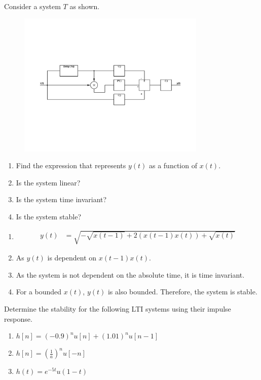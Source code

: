 \documentclass[fleqn, a4paper, 11pt, oneside]{amsart}
\theoremstyle{definition}
\theoremstyle{theorem}
\begin{document}
\begin{question}
	Consider a system $T$ as shown.
	\begin{figure}[H]
		\centering
		\includegraphics[width = 0.8\textwidth]{./plot2.pdf}
	\end{figure}
	\begin{enumerate}
		\item Find the expression that represents $y(t)$ as a function of $x(t)$.
		\item Is the system linear?
		\item Is the system time invariant?
		\item Is the system stable?
	\end{enumerate}
\end{question}

\begin{solution}
	\begin{enumerate}[leftmargin=*]
		\item
			\begin{align*}
				y(t) & = \sqrt{-\sqrt{x(t - 1)} + 2 \left( x(t - 1) x(t) \right) + \sqrt{x(t)}}
			\end{align*}
		\item
			As $y(t)$ is dependent on $x(t - 1) x(t)$.
		\item
			As the system is not dependent on the absolute time, it is time invariant.
		\item
			For a bounded $x(t)$, $y(t)$ is also bounded.
			Therefore, the system is stable.
	\end{enumerate}
\end{solution}

\begin{question}
	Determine the stability for the following LTI systems using their impulse response.
	\begin{enumerate}
		\item $h[n] = (-0.9)^n u[n] + (1.01)^n u[n - 1]$
		\item $h[n] = \left( \frac{1}{a} \right)^n u[-n]$
		\item $h(t) = e^{-5 t} u(1 - t)$
	\end{enumerate}
\end{question}
\end{document}
